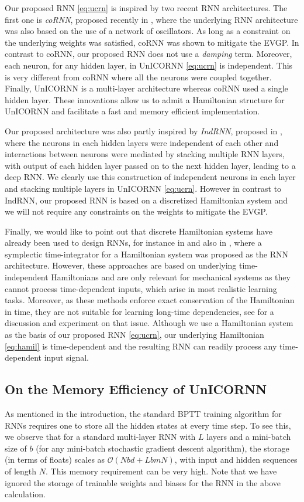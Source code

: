 \documentclass{article}
\begin{document}
Our proposed RNN \eqref{eq:ucrn} is inspired by two recent RNN architectures. The first one is \emph{coRNN}, proposed recently in \cite{coRNN}, where the underlying RNN architecture was also based on the use of a network of oscillators. As long as a constraint on the underlying weights was satisfied, coRNN was shown to mitigate the EVGP. In contrast to coRNN, our proposed RNN does not use a \emph{damping} term. Moreover, each neuron, for any hidden layer, in UnICORNN \eqref{eq:ucrn} is independent. This is very different from coRNN where all the neurons were coupled together. Finally, UnICORNN is a multi-layer architecture whereas coRNN used a single hidden layer. These innovations allow us to admit a Hamiltonian structure for UnICORNN and facilitate a fast and memory efficient implementation. 

Our proposed architecture was also partly inspired by \emph{IndRNN}, proposed in \cite{indrnn,deep_indrnn}, where the neurons in each hidden layers were independent of each other and interactions between neurons were mediated by stacking multiple RNN layers, with output of each hidden layer passed on to the next hidden layer, leading to a deep RNN. We clearly use this construction of independent neurons in each layer and stacking multiple layers in UnICORNN \eqref{eq:ucrn}. However in contrast to IndRNN, our proposed RNN is based on a discretized Hamiltonian system and we will not require any constraints on the weights to mitigate the EVGP.

Finally, we would like to point out that discrete Hamiltonian systems have already been used to design RNNs, for instance in \cite{hnn} and also in \cite{srnn}, where a symplectic time-integrator for a Hamiltonian system was proposed as the RNN architecture. However, these approaches are based on underlying time-independent Hamiltonians and are only relevant for mechanical systems as they cannot process time-dependent inputs, which arise in most realistic learning tasks. Moreover, as these methods enforce exact conservation of the Hamiltonian in time, they are not suitable for learning long-time dependencies, see \cite{inv_lstm} for a discussion and experiment on that issue. Although we use a Hamiltonian system as the basis of our proposed RNN \eqref{eq:ucrn}, our underlying Hamiltonian \eqref{eq:hamil} is time-dependent and the resulting RNN can readily process any time-dependent input signal. 
\subsection{On the Memory Efficiency of UnICORNN}
As mentioned in the introduction, the standard BPTT training algorithm for RNNs requires one to store all the hidden states at every time step. To see this, we observe that for a standard multi-layer RNN with $L$ layers and a mini-batch size of $b$ (for any mini-batch stochastic gradient descent algorithm), the storage (in terms of floats) scales as $\mathcal{O}(Nbd + LbmN)$, with input and hidden sequences of length $N$. This memory requirement can be very high. Note that we have ignored the storage of trainable weights and biases for the RNN in the above calculation.
\end{document}
